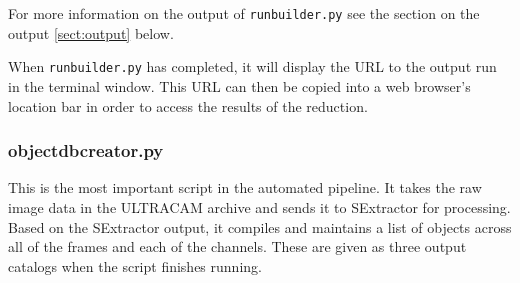 For more information on the output of \texttt{runbuilder.py} see the section on the output \ref{sect:output} below.

When \texttt{runbuilder.py} has completed, it will display the URL to the output run in the terminal window. This URL can then be copied into a web browser's location bar in order to access the results of the reduction.

\subsubsection{objectdbcreator.py}

This is the most important script in the automated pipeline. It takes the raw image data in the ULTRACAM archive and sends it to SExtractor for processing. Based on the SExtractor output, it compiles and maintains a list of objects across all of the frames and each of the channels. These are given as three output catalogs when the script finishes running. 

